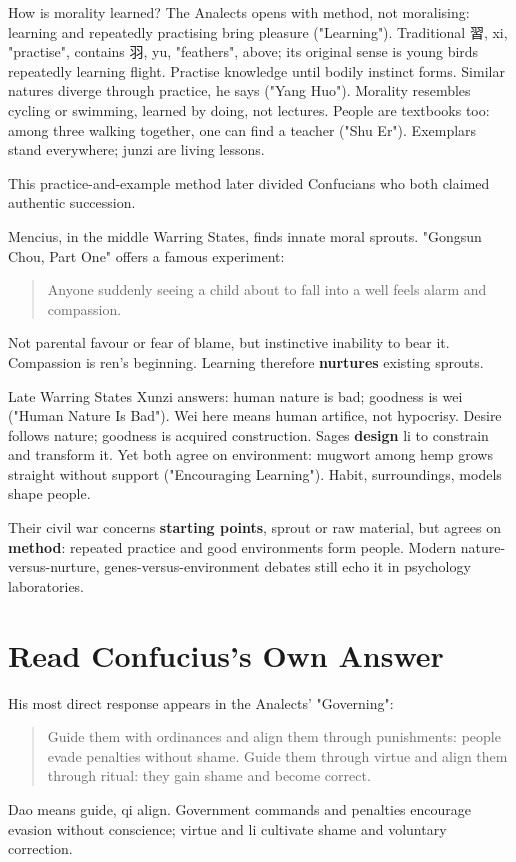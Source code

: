 How is morality learned? The Analects opens with method, not moralising: learning and repeatedly practising bring pleasure ("Learning"). Traditional \mbox{習}, xi, "practise", contains \mbox{羽}, yu, "feathers", above; its original sense is young birds repeatedly learning flight. Practise knowledge until bodily instinct forms. Similar natures diverge through practice, he says ("Yang Huo"). Morality resembles cycling or swimming, learned by doing, not lectures. People are textbooks too: among three walking together, one can find a teacher ("Shu Er"). Exemplars stand everywhere; junzi are living lessons.

This practice-and-example method later divided Confucians who both claimed authentic succession.

Mencius, in the middle Warring States, finds innate moral sprouts. "Gongsun Chou, Part One" offers a famous experiment:

\begin{quote}
Anyone suddenly seeing a child about to fall into a well feels alarm and compassion.
\end{quote}
Not parental favour or fear of blame, but instinctive inability to bear it. Compassion is ren's beginning. Learning therefore \textbf{nurtures} existing sprouts.

Late Warring States Xunzi answers: human nature is bad; goodness is wei ("Human Nature Is Bad"). Wei here means human artifice, not hypocrisy. Desire follows nature; goodness is acquired construction. Sages \textbf{design} li to constrain and transform it. Yet both agree on environment: mugwort among hemp grows straight without support ("Encouraging Learning"). Habit, surroundings, models shape people.

Their civil war concerns \textbf{starting points}, sprout or raw material, but agrees on \textbf{method}: repeated practice and good environments form people. Modern nature-versus-nurture, genes-versus-environment debates still echo it in psychology laboratories.

\section{Read Confucius's Own Answer}
His most direct response appears in the Analects' "Governing":

\begin{quote}
Guide them with ordinances and align them through punishments: people evade penalties without shame. Guide them through virtue and align them through ritual: they gain shame and become correct.
\end{quote}
Dao means guide, qi align. Government commands and penalties encourage evasion without conscience; virtue and li cultivate shame and voluntary correction.

